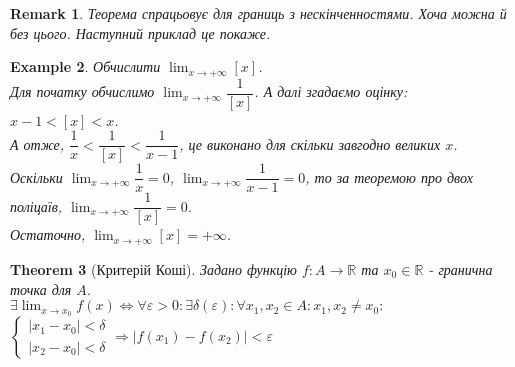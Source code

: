 \documentclass[a4paper, 14pt]{article}
\theoremstyle{theoremdd}
\newtheorem{theorem}{Theorem}[subsection]
\theoremstyle{theoremdd}
\theoremstyle{theoremdd}
\theoremstyle{theoremdd}
\newtheorem{example}[theorem]{Example}
\theoremstyle{theoremdd}
\theoremstyle{theoremdd}
\newtheorem{remark}[theorem]{Remark}
\theoremstyle{theoremdd}
\theoremstyle{theoremdd}
\begin{document}
	\begin{remark}
	Теорема спрацьовує для границь з нескінченностями. Хоча можна й без цього. Наступний приклад це покаже.
	\end{remark}
	
	\begin{example}
	Обчислити $\displaystyle\lim_{x \to +\infty} [x]$.\\
	
	Для початку обчислимо $\displaystyle\lim_{x \to +\infty} \dfrac{1}{[x]}$. А далі згадаємо оцінку: $x-1 < [x] < x$.\\
	А отже, $\dfrac{1}{x} < \dfrac{1}{[x]} < \dfrac{1}{x-1}$, це виконано для скільки завгодно великих $x$.\\
	Оскільки $\displaystyle\lim_{x \to + \infty} \dfrac{1}{x} = 0$, $\displaystyle\lim_{x \to + \infty} \dfrac{1}{x-1} = 0$, то за теоремою про двох поліцаїв, $\displaystyle\lim_{x \to +\infty} \dfrac{1}{[x]} = 0$.\\
	Остаточно, $\displaystyle\lim_{x \to +\infty} [x] = +\infty$.
	\end{example}
	
	\begin{theorem}[Критерій Коші]
Задано функцію $f: A \to \mathbb{R}$ та $x_0 \in \mathbb{R}$ - гранична точка для $A$.\\
$\exists \displaystyle \lim_{x \to x_0} f(x) \iff \forall \varepsilon > 0: \exists \delta(\varepsilon): \forall x_1,x_2 \in A: x_1,x_2 \neq x_0:$ 
$\begin{cases} |x_1-x_0|<\delta \\ |x_2-x_0|<\delta \end{cases} \Rightarrow |f(x_1)-f(x_2)|<\varepsilon
$
	\end{theorem}
	
\end{document}
